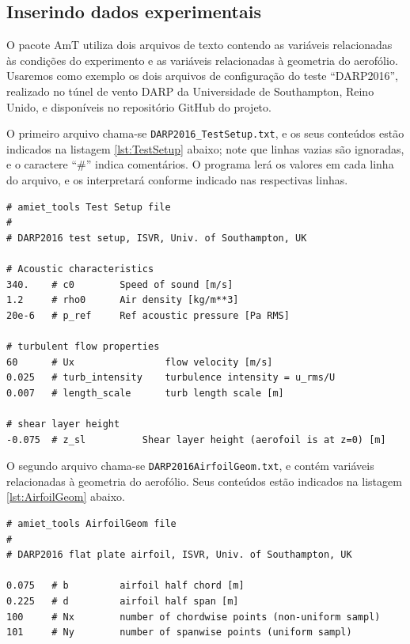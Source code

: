 \documentclass[a4paper, 11pt, twoside]{article}
\begin{document}
\subsection{Inserindo dados experimentais}

O pacote AmT utiliza dois arquivos de texto contendo as variáveis relacionadas às condições do experimento e as variáveis relacionadas à geometria do aerofólio. Usaremos como exemplo os dois arquivos de configuração do teste ``DARP2016'', realizado no túnel de vento DARP da Universidade de Southampton, Reino Unido, e disponíveis no repositório GitHub do projeto.

O primeiro arquivo chama-se \verb|DARP2016_TestSetup.txt|, e os seus conteúdos estão indicados na listagem \ref{lst:TestSetup} abaixo; note que linhas vazias são ignoradas, e o caractere ``\#'' indica comentários. O programa lerá os valores em cada linha do arquivo, e os interpretará conforme indicado nas respectivas linhas.

\begin{lstlisting}[caption={Arquivo \texttt{DARP2016\_TestSetup.txt}}, label={lst:TestSetup}]
# amiet_tools Test Setup file
#
# DARP2016 test setup, ISVR, Univ. of Southampton, UK

# Acoustic characteristics
340.	# c0		Speed of sound [m/s]
1.2		# rho0		Air density [kg/m**3]
20e-6	# p_ref		Ref acoustic pressure [Pa RMS]

# turbulent flow properties
60		# Ux				flow velocity [m/s]
0.025	# turb_intensity	turbulence intensity = u_rms/U
0.007	# length_scale		turb length scale [m]

# shear layer height
-0.075	# z_sl			Shear layer height (aerofoil is at z=0) [m]
\end{lstlisting}

O segundo arquivo chama-se \verb|DARP2016AirfoilGeom.txt|, e contém variáveis relacionadas à geometria do aerofólio. Seus conteúdos estão indicados na listagem \ref{lst:AirfoilGeom} abaixo.

\begin{lstlisting}[caption={Arquivo \texttt{DARP2016\_AirfoilGeom.txt}}, label={lst:AirfoilGeom}]
# amiet_tools AirfoilGeom file
#
# DARP2016 flat plate airfoil, ISVR, Univ. of Southampton, UK

0.075	# b			airfoil half chord [m]
0.225	# d 		airfoil half span [m]
100		# Nx 		number of chordwise points (non-uniform sampl)
101		# Ny 		number of spanwise points (uniform sampl)
\end{lstlisting}
\end{document}
